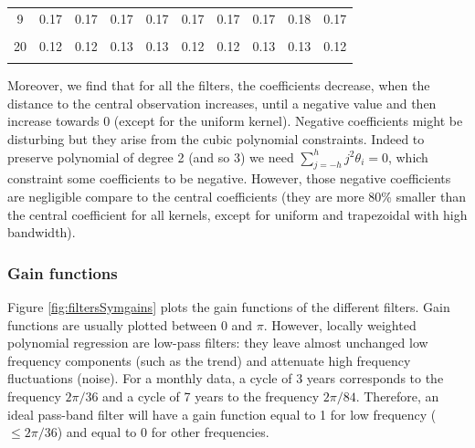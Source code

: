\documentclass[
  12pt,
  ,
  a4paper]{article}
\newcommand\1{\mathds{1}}
\begin{document}
\begin{table}[!h]
{\begin{tabular}[t]{cccccccccc}
9 & 0.17 & 0.17 & 0.17 & 0.17 & 0.17 & 0.17 & 0.17 & 0.18 & 0.17\\
\cellcolor{gray!6}{10} & \cellcolor{gray!6}{0.17} & \cellcolor{gray!6}{0.16} & \cellcolor{gray!6}{0.17} & \cellcolor{gray!6}{0.17} & \cellcolor{gray!6}{0.16} & \cellcolor{gray!6}{0.17} & \cellcolor{gray!6}{0.17} & \cellcolor{gray!6}{0.17} & \cellcolor{gray!6}{0.16}\\
20 & 0.12 & 0.12 & 0.13 & 0.13 & 0.12 & 0.12 & 0.13 & 0.13 & 0.12\\
\addlinespace
\cellcolor{gray!6}{30} & \cellcolor{gray!6}{0.10} & \cellcolor{gray!6}{0.10} & \cellcolor{gray!6}{0.10} & \cellcolor{gray!6}{0.10} & \cellcolor{gray!6}{0.10} & \cellcolor{gray!6}{0.10} & \cellcolor{gray!6}{0.10} & \cellcolor{gray!6}{0.10} & \cellcolor{gray!6}{0.10}\\
\bottomrule
\end{tabular}}
\end{table}

Moreover, we find that for all the filters, the coefficients decrease, when the distance to the central observation increases, until a negative value and then increase towards 0 (except for the uniform kernel).
Negative coefficients might be disturbing but they arise from the cubic polynomial constraints.
Indeed to preserve polynomial of degree 2 (and so 3) we need \(\sum_{j=-h}^hj^2\theta_i=0\), which constraint some coefficients to be negative.
However, those negative coefficients are negligible compare to the central coefficients (they are more 80\% smaller than the central coefficient for all kernels, except for uniform and trapezoidal with high bandwidth).

\hypertarget{gain-functions}{%
\subsubsection{Gain functions}\label{gain-functions}}

Figure \ref{fig:filtersSymgains} plots the gain functions of the different filters.
Gain functions are usually plotted between 0 and \(\pi\).
However, locally weighted polynomial regression are low-pass filters: they leave almost unchanged low frequency components (such as the trend) and attenuate high frequency fluctuations (noise).
For a monthly data, a cycle of 3 years corresponds to the frequency \(2\pi/36\) and a cycle of 7 years to the frequency \(2\pi/84\).
Therefore, an ideal pass-band filter will have a gain function equal to 1 for low frequency (\(\leq 2\pi/36\)) and equal to 0 for other frequencies.
\end{document}
